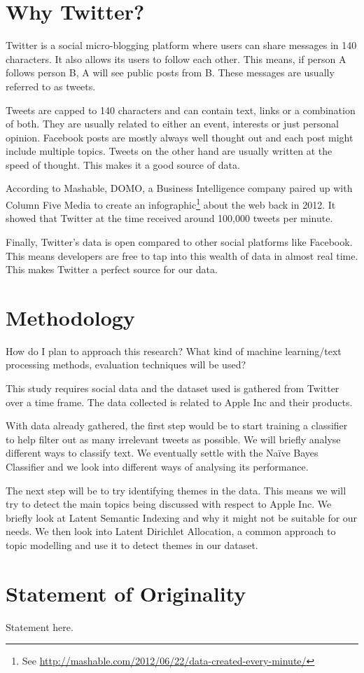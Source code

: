 \section{Why Twitter?}
\label{sec:why_twitter}
Twitter is a social micro-blogging platform where users can share messages in 140 characters. It
also allows its users to follow each other. This means, if person A follows person B, A will see
public posts from B. These messages are usually referred to as tweets.

Tweets are capped to 140 characters and can contain text, links or a combination of both. They are
usually related to either an event, interests or just personal opinion. Facebook posts are mostly
always well thought out and each post might include multiple topics. Tweets on the other hand are
usually written at the speed of thought. This makes it a good source of data.

According to Mashable, DOMO, a Business Intelligence company paired up with Column Five Media to
create an infographic\footnote{See \url{http://mashable.com/2012/06/22/data-created-every-minute/}} about the
web back in 2012. It showed that Twitter at the time received around 100,000 tweets per minute.

Finally, Twitter's data is open compared to other social platforms like Facebook. This means
developers are free to tap into this wealth of data in almost real time. This makes Twitter a
perfect source for our data.


\section{Methodology}
\label{sec:methodology}
How do I plan to approach this research? What kind of machine learning/text processing methods,
evaluation techniques will be used?

This study requires social data and the dataset used is gathered from Twitter over a time frame.
The data collected is related to Apple Inc and their products.

With data already gathered, the first step would be to start training a classifier to help filter
out as many irrelevant tweets as possible. We will briefly analyse different ways to classify text.
We eventually settle with the Na\"{i}ve Bayes Classifier and we look into different ways of analysing
its performance.

The next step will be to try identifying themes in the data. This means we will try to detect the
main topics being discussed with respect to Apple Inc. We briefly look at Latent Semantic Indexing
and why it might not be suitable for our needs. We then look into Latent Dirichlet Allocation, a
common approach to topic modelling and use it to detect themes in our dataset.


\section{Statement of Originality}

Statement here.

